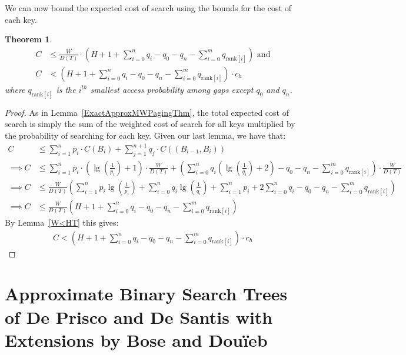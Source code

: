 \documentclass[letterpaper,12pt,titlepage,oneside,final]{book}
\theoremstyle{plain}
\newtheorem{thm}{Theorem}[section]
\begin{document}
We can now bound the expected cost of search using the bounds for the cost of each key.

\begin{thm} \label{ApproxMWPagingThm}
\begin{align*}
C &\leq  \frac{W}{D(T)} \cdot  \left(H + 1 + \sum_{i=0}^n q_i - q_0 - q_n - \sum_{i=0}^m q_{\text{rank}[i]} \right) \text{ and}\\
C &< \left(H + 1 + \sum_{i=0}^n q_i - q_0 - q_n - \sum_{i=0}^m q_{\text{rank}[i]} \right) \cdot  c_h
\end{align*}
where $q_{\text{rank}[i]}$ is the $i^{th}$ smallest access probability among gaps except $q_0$ and $q_n$.
\end{thm}

\begin{proof}
As in Lemma~\ref{ExactApproxMWPagingThm}, the total expected cost of search is simply the sum of the weighted cost of search for all keys multiplied by the probability of searching for each key. Given our last lemma, we have that:
\begin{align*}
C &\leq \sum_{i=1}^{n} p_i\cdot C(B_i) + \sum_{j=1}^{n+1} q_j\cdot C((B_{i-1},B_i)) \\
\implies C &\leq \sum_{i=1}^{n} p_i\cdot (\lg(\frac{1}{p_i})+1)\cdot \frac{W}{D(T)} + \left(\sum_{i=0}^{n} q_i(\lg(\frac{1}{q_i})+2) - q_0 - q_n -  \sum_{i=0}^m q_{\text{rank}[i]} \right)\cdot \frac{W}{D(T)} \\
\implies C &\leq \frac{W}{D(T)} \left(\sum_{i=1}^{n} p_i\lg(\frac{1}{p_i}) + \sum_{i=0}^{n} q_i\lg(\frac{1}{q_i}) + \sum_{i=1}^{n} p_i + 2\sum_{i=0}^{n} q_i - q_0 - q_n - \sum_{i=0}^m q_{\text{rank}[i]} \right) \\
\implies C &\leq  \frac{W}{D(T)} \left(H + 1 + \sum_{i=0}^n q_i - q_0 - q_n - \sum_{i=0}^m q_{\text{rank}[i]} \right)
\end{align*}
By Lemma~\ref{W<HT} this gives:
\begin{align*}
C < \left(H + 1 + \sum_{i=0}^n q_i - q_0 - q_n - \sum_{i=0}^m q_{\text{rank}[i]} \right) \cdot  c_h
\end{align*}

\end{proof}


\section{Approximate Binary Search Trees of De Prisco and De Santis with Extensions by Bose and Dou\"{i}eb} \label{sec:deBST}
\end{document}
